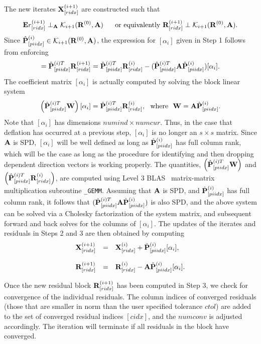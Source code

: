 \documentclass[twoside]{siamltex}
\newcommand{\bA}{{\bf A}}
\newcommand{\bE}{{\bf E}}
\newcommand{\bP}{{\bf P}}
\newcommand{\bW}{{\bf W}}
\newcommand{\bR}{{\bf R}}
\newcommand{\bX}{{\bf X}}
\newcommand{\dm}{\begin{displaymath}}
\newcommand{\edm}{\end{displaymath}}
\begin{document}
The new iterates $\bX^{(i+1)}_{[ridx]}$ are constructed such that
 \dm
  \bE r_{[ridx]}^{(i+1)}  \perp_{\bA}  {\cal K}_{i+1} (\bR^{(0)}, \bA) \\
  ~~~~~{\rm or~equivalently}~~ \\
  \bR_{[ridx]}^{(i+1)}  \perp  {\cal K}_{i+1} (\bR^{(0)}, \bA).
  \edm
Since ${\hat \bP}^{(i)}_{[piidx]} \in {\cal K}_{i+1}(\bR^{(0)},
\bA)$, the expression for $[\alpha_i]$ given in Step 1 follows
from enforcing
 \dm
 [ {\bf 0} ] = {\hat \bP}^{(i)T}_{[piidx]} \bR^{(i+1)}_{[ridx]} =
   {\hat \bP}^{(i)T}_{[piidx]} \bR^{(i)}_{[ridx]}
 - ( {\hat \bP}^{(i)T}_{[piidx]} \bA {\hat \bP}^{(i)}_{[piidx]})
 [ \alpha_i ].
 \edm
The coefficient matrix $[\alpha_i]$ is actually computed by
solving the block linear system
 \dm
 \left( {\hat \bP}^{(i)T}_{[piidx]} \bW \right)
 [ \alpha_i ] = {\hat \bP}^{(i)T}_{[piidx]} \bR^{(i)}_{[ridx]}, ~~
 {\rm where}~~\bW = \bA {\hat \bP}_{[piidx]}^{(i)}.
 \edm
Note that $[\alpha_i]$ has dimensions $numind \times numcur$.
Thus, in the case that deflation has occurred at a previous step,
$[\alpha_i]$ is no longer an $s \times s$ matrix. Since $\bA$ is
SPD, $[\alpha_i]$ will be well defined as long as ${\hat
\bP}^{(i)}_{[piidx]}$ has full column rank, which will be the case
as long as the procedure for identifying and then dropping
dependent direction vectors is working properly. The quantities,
$\left( {\hat \bP}_{[piidx]}^{(i)T} \bW \right)$ and $\left( {\hat
\bP}_{[piidx]}^{(i)T} \bR_{[ridx]}^{(i)} \right)$, are computed
using Level 3 {\small BLAS}~\cite{dddh:90} matrix-matrix
multiplication subroutine {\tt \_GEMM}. Assuming that $\bA$ is
SPD, and ${\hat \bP}^{(i)}_{[piidx]}$ has full column rank, it
follows that $( {\hat \bP}^{(i)T}_{[piidx]} \bA {\hat
\bP}^{(i)}_{[piidx]})$ is also SPD, and the above system can be
solved via a Cholesky factorization of the system matrix, and
subsequent forward and back solves for the columns of
$[\alpha_i]$. The updates of the iterates and residuals in Steps 2
and 3 are then obtained by computing
 \dm
 \begin{array}{rcl}
  \bX_{[ridx]}^{(i+1)} &=& \bX_{[ridx]}^{(i)} + {\hat \bP}_{[piidx]}^{(i)}
  [\alpha_i],
  \\ \\
  \bR_{[ridx]}^{(i+1)} &=& \bR_{[ridx]}^{(i)} - \bA {\hat \bP}_{[piidx]}^{(i)}
  [\alpha_i].
  \end{array}
 \edm

Once the new residual block $\bR^{(i+1)}_{[ridx]}$ has been
computed in Step 3, we check for convergence of the individual
residuals. The column indices of converged residuals (those that
are smaller in norm than the user specified tolerance $ctol$) are
added to the set of converged residual indices $[cidx]$, and the
$numconv$ is adjusted accordingly. The iteration will terminate if
all residuals in the block have converged.
\end{document}

